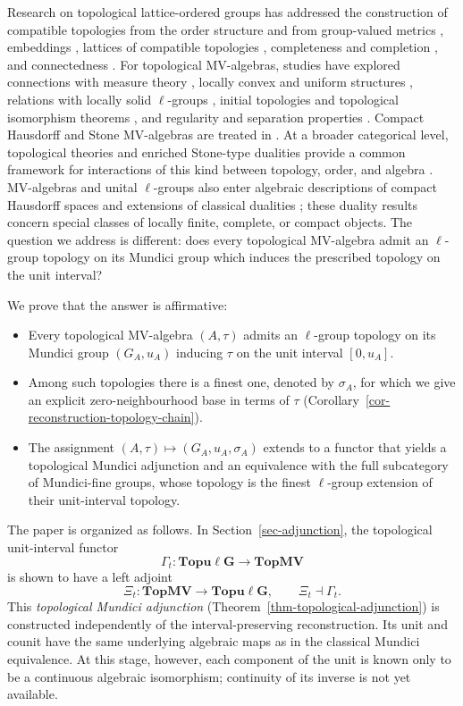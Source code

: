 \documentclass[preprint,3p]{elsarticle}
\theoremstyle{plain}
\theoremstyle{definition}
\newcommand{\TopMV}{\mathbf{TopMV}}
\newcommand{\Topulg}{\mathbf{Topu\ell G}}
\numberwithin{equation}{section}
\begin{document}
Research on topological lattice-ordered groups has addressed
the construction of compatible topologies from the order structure
\cite{Kalton1974,Redfield1974,Yang2009a} and from group-valued
metrics \cite{Kopperman2011}, embeddings \cite{Madell1969},
lattices of compatible topologies \cite{Smarda1976},
completeness and completion \cite{Jordan2018},
and connectedness \cite{Jordan2023}.
For topological MV-algebras, studies have explored connections with
measure theory \cite{Weber2011}, locally convex and uniform structures
\cite{Weber2012,Li2026,Li2027}, relations with locally solid $\ell$-groups
\cite{Weber2023}, initial topologies and topological isomorphism
theorems \cite{Yin2025}, and regularity and separation properties
\cite{Gan2024}.
Compact Hausdorff and Stone MV-algebras are treated in
\cite{Nganou2017,Nganou2019}.
At a broader categorical level, topological theories and enriched
Stone-type dualities provide a common framework for interactions of
this kind between topology, order, and algebra
\cite{Hofmann2007,Hofmann2018}.
MV-algebras and unital $\ell$-groups also enter algebraic descriptions
of compact Hausdorff spaces and extensions of classical dualities
\cite{Cignoli2004,Marra2017,Abbadini2025};
these duality results concern special classes of locally finite,
complete, or compact objects.
The question we address is different: does every topological MV-algebra
admit an $\ell$-group topology on its Mundici group which induces the
prescribed topology on the unit interval?

We prove that the answer is affirmative:
\begin{itemize}[beginpenalty=10000]
\item Every topological MV-algebra $(A,\tau)$ admits an $\ell$-group
topology on its Mundici group $(G_A,u_A)$ inducing $\tau$ on the unit
interval $[0,u_A]$.
\item Among such topologies there is a finest one, denoted by $\sigma_A$,
for which we give an explicit zero-neighbourhood base in terms of $\tau$
(Corollary~\ref{cor-reconstruction-topology-chain}).
\item The assignment $(A,\tau)\mapsto(G_A,u_A,\sigma_A)$ extends to a
functor that yields a topological Mundici adjunction and an equivalence
with the full subcategory of Mundici-fine groups, whose topology is the
finest $\ell$-group extension of their unit-interval topology.
\end{itemize}

The paper is organized as follows.
In Section~\ref{sec-adjunction}, the topological unit-interval functor
\[
 \Gamma_t\colon\Topulg\longrightarrow\TopMV
\]
is shown to have a left adjoint
\[
 \Xi_t\colon\TopMV\longrightarrow\Topulg,
 \qquad \Xi_t\dashv\Gamma_t.
\]
This \emph{topological Mundici adjunction}
(Theorem~\ref{thm-topological-adjunction}) is constructed independently
of the interval-preserving reconstruction.
Its unit and counit have the same underlying algebraic maps as in the
classical Mundici equivalence.
At this stage, however, each component of the unit is known only to
be a continuous algebraic isomorphism; continuity of its inverse is
not yet available.
\end{document}
